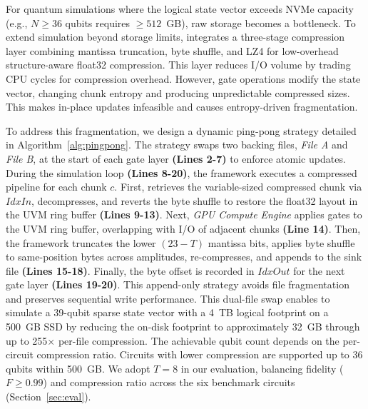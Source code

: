 For quantum simulations where the logical state vector exceeds NVMe capacity (e.g., $N \ge 36$ qubits requires $\ge 512$~GB), raw storage becomes a bottleneck. To extend simulation beyond storage limits, \EdgeQuantum integrates a three-stage compression layer combining mantissa truncation, byte shuffle, and LZ4 for low-overhead structure-aware float32 compression. This layer reduces I/O volume by trading CPU cycles for compression overhead. However, gate operations modify the state vector, changing chunk entropy and producing unpredictable compressed sizes. This makes in-place updates infeasible and causes entropy-driven fragmentation.

To address this fragmentation, we design a dynamic ping-pong strategy detailed in Algorithm~\ref{alg:pingpong}. The strategy swaps two backing files, \textit{File A} and \textit{File B}, at the start of each gate layer \textbf{(Lines 2-7)} to enforce atomic updates. During the simulation loop \textbf{(Lines 8-20)}, the framework executes a compressed pipeline for each chunk $c$. First, \EdgeQuantum retrieves the variable-sized compressed chunk via $IdxIn$, decompresses, and reverts the byte shuffle to restore the float32 layout in the UVM ring buffer \textbf{(Lines 9-13)}. Next, \textit{GPU Compute Engine} applies gates to the UVM ring buffer, overlapping with I/O of adjacent chunks \textbf{(Line 14)}. Then, the framework truncates the lower $(23-T)$ mantissa bits, applies byte shuffle to same-position bytes across amplitudes, re-compresses, and appends to the sink file \textbf{(Lines 15-18)}. Finally, the byte offset is recorded in $IdxOut$ for the next gate layer \textbf{(Lines 19-20)}. This append-only strategy avoids file fragmentation and preserves sequential write performance. This dual-file swap enables \EdgeQuantum to simulate a 39-qubit sparse state vector with a 4~TB logical footprint on a 500~GB SSD by reducing the on-disk footprint to approximately 32~GB through up to 255$\times$ per-file compression. The achievable qubit count depends on the per-circuit compression ratio. Circuits with lower compression are supported up to 36 qubits within 500~GB. We adopt $T=8$ in our evaluation, balancing fidelity ($F \geq 0.99$) and compression ratio across the six benchmark circuits (Section~\ref{sec:eval}).



